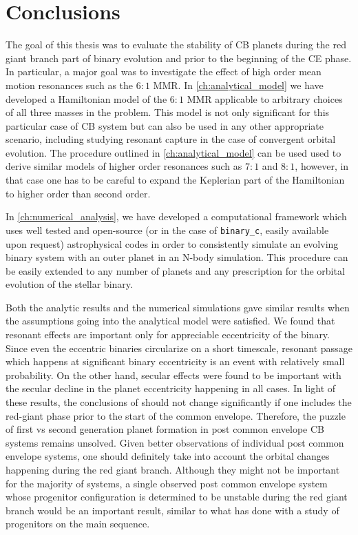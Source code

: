 \documentclass[twoside,openright,titlepage,numbers=noenddot,headinclude,%
                footinclude=true,cleardoublepage=empty,abstractoff, 
                BCOR=5mm,paper=a4,fontsize=11pt,%
                american,%
                ]{scrreprt}%
\begin{document}
\clearpage
\chapter{Conclusions}
\label{ch:conclusions}
The goal of this thesis was to evaluate the stability of CB planets during
the red giant branch part of binary evolution and prior to the beginning
of the CE phase. In particular, a major goal was to investigate the effect
of high order mean motion resonances such as the $6:1$ MMR. In 
\cref{ch:analytical_model} we have developed a Hamiltonian model of the
$6:1$ MMR applicable to arbitrary choices of all three masses in the problem.
This model is not only significant for this particular case of CB system
but can also be used in any other appropriate scenario, including studying
resonant capture in the case of convergent orbital evolution. The procedure
outlined in \cref{ch:analytical_model} can be used used to derive similar
models of higher order resonances such as $7:1$ and $8:1$, however, in that
case one has to be careful to expand the Keplerian part of the Hamiltonian
to higher order than second order.

In \cref{ch:numerical_analysis}, we have developed a computational framework
which uses well tested and open-source (or in the case 
of \texttt{binary\_c}, easily available
upon request) astrophysical codes in order to consistently simulate an
evolving binary system with an outer planet in an N-body simulation. This 
procedure can be easily extended to any number of planets and any prescription
for the orbital evolution of the stellar binary.

Both the analytic results  and the numerical simulations gave similar results
when the assumptions going into the analytical model were satisfied. We
found that resonant effects are important only for appreciable eccentricity
of the binary. Since even the eccentric binaries circularize on a short 
timescale, resonant passage which happens at significant binary eccentricity
is an event with relatively small probability. On the other hand, secular
effects were found to be important with the secular decline in the 
planet eccentricity happening in all cases. In light of these results,
the conclusions of \citet{Kostov2016} should not change significantly 
if one includes the red-giant phase prior to the start of the common envelope.
Therefore, the puzzle of first vs second generation planet formation in
post common envelope CB systems remains unsolved. Given better observations
of individual post common envelope systems, one should definitely take
into account the orbital changes happening during the red giant branch. 
Although they might not be important for the majority of systems, a single 
observed post common envelope system whose progenitor configuration
is determined to be unstable during the red giant branch 
would be an important result, similar to what \citet{Mustill2013a} 
has done with a study of progenitors on the main sequence.
\end{document}
